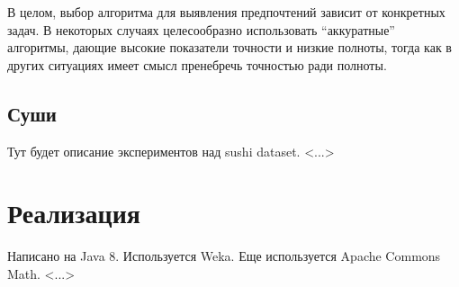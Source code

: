 	В целом, выбор алгоритма для выявления предпочтений зависит от конкретных задач. В некоторых случаях целесообразно использовать ``аккуратные'' алгоритмы, дающие высокие показатели точности и низкие полноты, тогда как в других ситуациях имеет смысл пренебречь точностью ради полноты.
	
	\subsection{Суши} 
	\label{subsec:exp_sushi}
		Тут будет описание экспериментов над sushi dataset.
		<...>


\section{Реализация}
	Написано на Java 8. Используется Weka. Еще используется Apache Commons Math.
	<...>
